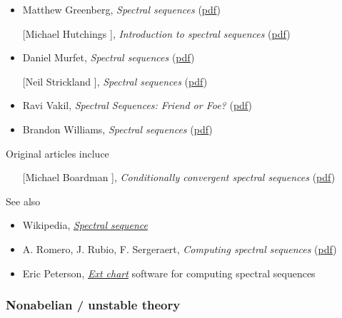 \documentclass[12pt,titlepage]{article}
\theoremstyle{plain}
\theoremstyle{definition}
\theoremstyle{remark}
\begin{document}
\begin{itemize}%
\item Matthew Greenberg, \emph{Spectral sequences} (\href{http://www.math.mcgill.ca/goren/SeminarOnCohomology/specseq.pdf}{pdf})


\item [[Michael Hutchings]], \emph{Introduction to spectral sequences} (\href{http://math.berkeley.edu/~hutching/teach/215b-2011/ss.pdf}{pdf})


\item Daniel Murfet, \emph{Spectral sequences} (\href{http://therisingsea.org/notes/SpectralSequences.pdf}{pdf})


\item [[Neil Strickland]], \emph{Spectral sequences} (\href{http://neil-strickland.staff.shef.ac.uk/courses/bestiary/ss.pdf}{pdf})


\item Ravi Vakil, \emph{Spectral Sequences: Friend or Foe?} (\href{http://math.stanford.edu/~vakil/0708-216/216ss.pdf}{pdf})


\item Brandon Williams, \emph{Spectral sequences} (\href{http://www.math.sunysb.edu/~mbw/notes/orals/Spectral%20Sequences.pdf}{pdf})



\end{itemize}
Original articles incluce

\begin{itemize}%
\item [[Michael Boardman]], \emph{Conditionally convergent spectral sequences} (\href{http://hopf.math.purdue.edu/Boardman/ccspseq.pdf}{pdf})

\end{itemize}
See also

\begin{itemize}%
\item Wikipedia, \emph{\href{http://en.wikipedia.org/wiki/Spectral_sequence}{Spectral sequence}}

\end{itemize}
\begin{itemize}%
\item A. Romero, J. Rubio, F. Sergeraert, \emph{Computing spectral sequences} (\href{http://www-fourier.ujf-grenoble.fr/~sergerar/Papers/Ana-JSC.pdf}{pdf})


\item Eric Peterson, \emph{\href{http://ext-chart.org}{Ext chart}} software for computing spectral sequences



\end{itemize}
\hypertarget{ReferencesNonabelian}{}\subsubsection*{{Nonabelian / unstable theory}}\label{ReferencesNonabelian}
\end{document}
